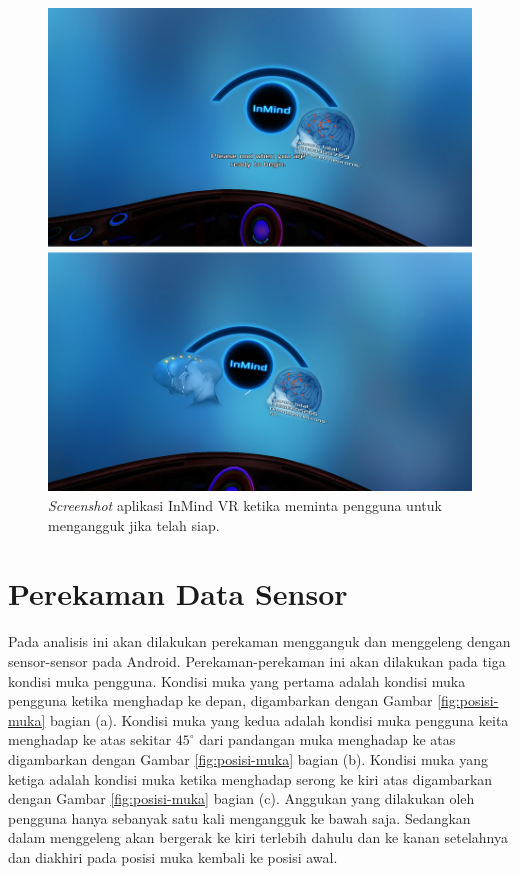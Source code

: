 \begin{figure}[htbp]
\centering
\includegraphics[scale=0.6]{Gambar/screenshot-inmind-nod.png}
\caption{\textit{Screenshot} aplikasi InMind VR ketika meminta pengguna untuk mengangguk jika telah siap.}
\label{fig:screenshot_inmind_nod}
\end{figure}



\section{Perekaman Data Sensor}
\label{sec:perekaman_data_sensor}

Pada analisis ini akan dilakukan perekaman mengganguk dan menggeleng dengan sensor-sensor pada Android. Perekaman-perekaman ini akan dilakukan pada tiga kondisi muka pengguna. Kondisi muka yang pertama adalah kondisi muka pengguna ketika menghadap ke depan, digambarkan dengan Gambar \ref{fig:posisi-muka} bagian (a). Kondisi muka yang kedua adalah kondisi muka pengguna keita menghadap ke atas sekitar $45^{\circ}$ dari pandangan muka menghadap ke atas digambarkan dengan Gambar \ref{fig:posisi-muka} bagian (b). Kondisi muka yang ketiga adalah kondisi muka ketika menghadap serong ke kiri atas digambarkan dengan Gambar \ref{fig:posisi-muka} bagian (c). Anggukan yang dilakukan oleh pengguna hanya sebanyak satu kali mengangguk ke bawah saja. Sedangkan dalam menggeleng akan bergerak ke kiri terlebih dahulu dan ke kanan setelahnya dan diakhiri pada posisi muka kembali ke posisi awal.

